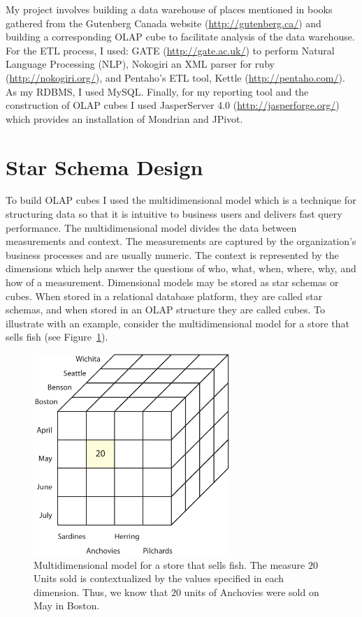My project involves building a data warehouse of places mentioned in books gathered from the Gutenberg Canada website (\url{http://gutenberg.ca/}) and building
a corresponding OLAP cube to facilitate analysis of the data warehouse. For the ETL process, I used: GATE (\url{http://gate.ac.uk/}) to perform Natural
Language Processing (NLP), Nokogiri an XML parser for ruby (\url{http://nokogiri.org/}), and Pentaho’s ETL tool, Kettle (\url{http://pentaho.com/}). As my
RDBMS, I used MySQL. Finally, for my reporting tool and the construction of OLAP cubes I used JasperServer 4.0 (\url{http://jasperforge.org/}) which provides
an installation of Mondrian and JPivot.


\section{Star Schema Design} %
\label{sec:star_schema}

To build OLAP cubes I used the multidimensional model which is a technique for structuring data so that it is intuitive to business users and delivers fast
query performance. The multidimensional model divides the data between measurements and context. The measurements are captured by the organization's business
processes and are usually numeric. The context is represented by the dimensions which help answer the questions of who, what, when, where, why, and how of a
measurement. Dimensional models may be stored as star schemas or cubes. When stored in a relational database platform, they are called star schemas, and when
stored in an OLAP structure they are called cubes. To illustrate with an example, consider the multidimensional model for a store that sells fish (see
Figure~\ref{fig:figures_FishMDModel}).

\begin{figure}[htbp]
    \centering
        \includegraphics[height=3in]{figures/FishMDModel.pdf}
    \caption{Multidimensional model for a store that sells fish. The measure $20$ Units sold is contextualized by the values specified in each dimension. Thus, we know that $20$ units of Anchovies were sold on May in Boston.}
    \label{fig:figures_FishMDModel}
\end{figure}

